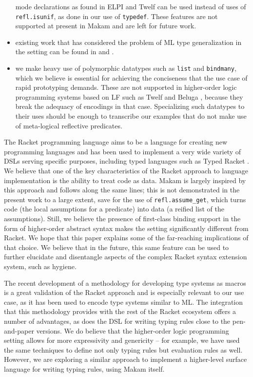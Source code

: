 \begin{itemize}
  mode declarations as found in ELPI and Twelf
  \citep{twelf-main-reference} can be used instead of uses of
  \texttt{refl.isunif}, as done in our use of \texttt{typedef}. These
  features are not supported at present in Makam and are left for future
  work.
\item
  existing work that has considered the problem of ML type
  generalization in the \lamprolog setting can be found in
  \citet{typgen-lamprolog-1} and \citet{typgen-lamprolog-2}.
\item
  we make heavy use of polymorphic datatypes such as \texttt{list} and
  \texttt{bindmany}, which we believe is essential for achieving the
  conciseness that the use case of rapid prototyping demands. These are
  not supported in higher-order logic programming systems based on LF
  \citep{lf-main-reference} such as Twelf \citep{twelf-main-reference}
  and Beluga \citep{beluga-main-reference}, because they break the
  adequacy of encodings in that case. Specializing such datatypes to
  their uses should be enough to transcribe our examples that do not
  make use of meta-logical reflective predicates.
\end{itemize}

 The Racket programming language aims to be a language
for creating new programming languages \citep{racket-manifesto} and has
been used to implement a very wide variety of DSLs serving specific
purposes, including typed languages such as Typed Racket
\citet{typed-racket-main-reference}. We believe that one of the key
characteristics of the Racket approach to language implementation is the
ability to treat code as data. Makam is largely inspired by this
approach and follows along the same lines; this is not demonstrated in
the present work to a large extent, save for the use of
\texttt{refl.assume\_get}, which turns code (the local assumptions for a
predicate) into data (a reified list of the assumptions). Still, we
believe the presence of first-class binding support in the form of
higher-order abstract syntax makes the \lamprolog setting significantly
different from Racket. We hope that this paper explains some of the
far-reaching implications of that choice. We believe that in the future,
this same feature can be used to further elucidate and disentangle
aspects of the complex Racket syntax extension system, such as hygiene.

The recent development of a methodology for developing type systems as
macros \citet{racket-type-systems-as-macros} is a great validation of
the Racket approach and is especially relevant to our use case, as it
has been used to encode type systems similar to ML. The integration that
this methodology provides with the rest of the Racket ecosystem offers a
number of advantages, as does the  DSL for writing
typing rules close to the pen-and-paper versions. We do believe that the
higher-order logic programming setting allows for more expressivity and
genericity -- for example, we have used the same techniques to define
not only typing rules but evaluation rules as well. However, we are
exploring a similar approach to implement a higher-level surface
language for writing typing rules, using Makam itself.




